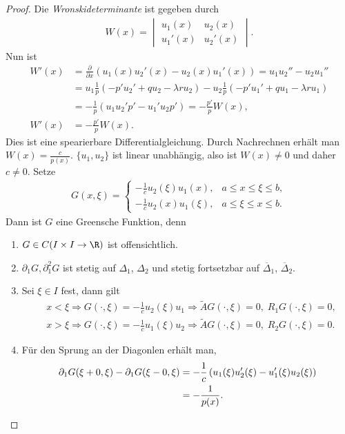 \begin{proof}
Die \emph{Wronskideterminante} ist gegeben durch
\begin{align*}
W(x) = \begin{vmatrix}
u_1(x) & u_2(x)\\
u_1'(x) & u_2'(x)
\end{vmatrix}.
\end{align*}
Nun ist
\begin{align*}
W'(x) &= \frac{\partial}{\partial x}\left(u_1(x)u_2'(x) - u_2(x)u_1'(x) \right)
= u_1u_2'' - u_2u_1''\\
&= u_1\frac{1}{p}\left(-p'u_2' + qu_2 -\lambda ru_2\right) -
u_2\frac{1}{p}\left(-p'u_1'+qu_1 -\lambda ru_1\right)\\
&= -\frac{1}{p}\left(u_1u_2' p' - u_1'u_2 p'\right)
= -\frac{p'}{p}W(x),\\
W'(x) &= -\frac{p'}{p}W(x).
\end{align*}
Dies ist eine spearierbare Differentialgleichung. Durch Nachrechnen erhält man
$W(x) = \frac{c}{p(x)}$. $\{u_1,u_2\}$ ist linear unabhängig, also ist
$W(x)\neq 0$ und daher $c\neq 0$. Setze
\begin{align*}
G(x,\xi) =
\begin{cases}
-\frac{1}{c}u_2(\xi)u_1(x), & a \le x \le \xi \le b,\\
-\frac{1}{c}u_2(x)u_1(\xi), & a \le \xi \le x \le b.
\end{cases}
\end{align*}
Dann ist $G$ eine Greensche Funktion, denn
\begin{enumerate}[label=\arabic{*}.)]
  \item $G\in C(I\times I\to\R)$ ist offensichtlich.
  \item $\partial_1 G,\partial_1^2 G$ ist stetig auf $\Delta_1$, $\Delta_2$ und
  stetig fortsetzbar auf $\overline{\Delta}_1$, $\overline{\Delta}_2$.
  \item Sei $\xi\in I$ fest, dann gilt
\begin{align*}
&x < \xi \Rightarrow G(\cdot,\xi) = -\frac{1}{c}u_2(\xi)u_1 \Rightarrow
\tilde{A}G(\cdot,\xi) = 0,\; R_1G(\cdot,\xi) = 0,\\
&x > \xi \Rightarrow G(\cdot,\xi) = -\frac{1}{c}u_1(\xi)u_2 \Rightarrow
\tilde{A}G(\cdot,\xi) = 0,\; R_2G(\cdot,\xi) = 0.
\end{align*}
\item Für den Sprung an der Diagonlen erhält man,
\begin{align*}
\partial_1 G(\xi+0,\xi)- \partial_1G(\xi-0,\xi) &=
-\frac{1}{c}\left(u_1(\xi)u_2'(\xi) - u_1'(\xi)u_2(\xi)\right) \\ &=
-\frac{1}{p(x)}.\qedhere
\end{align*}
\end{enumerate}
\end{proof}

